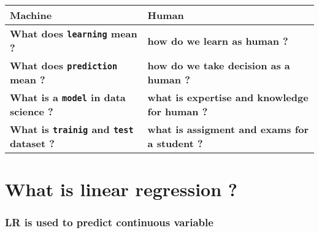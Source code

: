 \documentclass[11pt]{article}
\begin{document}
\begin{longtable}[]{@{}ll@{}}
\toprule
\begin{minipage}[b]{0.39\columnwidth}\raggedright\strut
\textbf{Machine}\strut
\end{minipage} & \begin{minipage}[b]{0.55\columnwidth}\raggedright\strut
\textbf{Human}\strut
\end{minipage}\tabularnewline
\midrule
\endhead
\begin{minipage}[t]{0.39\columnwidth}\raggedright\strut
\textbf{What does \texttt{learning} mean ?}\strut
\end{minipage} & \begin{minipage}[t]{0.55\columnwidth}\raggedright\strut
\textbf{how do we learn as human ?}\strut
\end{minipage}\tabularnewline
\begin{minipage}[t]{0.39\columnwidth}\raggedright\strut
\textbf{What does \texttt{prediction} mean ?}\strut
\end{minipage} & \begin{minipage}[t]{0.55\columnwidth}\raggedright\strut
\textbf{how do we take decision as a human ?}\strut
\end{minipage}\tabularnewline
\begin{minipage}[t]{0.39\columnwidth}\raggedright\strut
\textbf{What is a \texttt{model} in data science ?}\strut
\end{minipage} & \begin{minipage}[t]{0.55\columnwidth}\raggedright\strut
\textbf{what is expertise and knowledge for human ?}\strut
\end{minipage}\tabularnewline
\begin{minipage}[t]{0.39\columnwidth}\raggedright\strut
\textbf{What is \texttt{trainig} and \texttt{test} dataset ?}\strut
\end{minipage} & \begin{minipage}[t]{0.55\columnwidth}\raggedright\strut
\textbf{what is assigment and exams for a student ?}\strut
\end{minipage}\tabularnewline
\bottomrule
\end{longtable}

    \section{What is linear regression ?}\label{what-is-linear-regression}

    \subsubsection{\texorpdfstring{LR is used to predict \textbf{continuous}
variable}{LR is used to predict continuous variable}}\label{lr-is-used-to-predict-continuous-variable}
\end{document}
